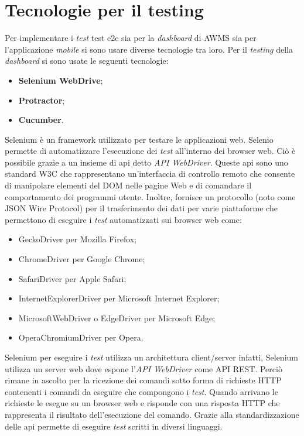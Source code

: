 \section{Tecnologie per il testing}
Per implementare i \emph{test} \gls{test e2e} sia per la \emph{dashboard} di \gls{AWMS} sia per l'applicazione \emph{mobile} si sono usare diverse tecnologie tra loro. Per il \emph{testing} della \emph{dashboard} si sono usate le seguenti tecnologie:
\begin{itemize}
	\item \textbf{Selenium WebDrive};
	\item \textbf{Protractor};
	\item \textbf{Cucumber}.
\end{itemize}
Selenium è un framework utilizzato per testare le applicazioni web. Selenio permette di  automatizzare l'esecuzione dei \emph{test} all'interno dei browser web. Ciò è possibile grazie a un insieme di \gls{api}\ap{[g]} detto \emph{API WebDriver}. Queste \gls{api}\ap{[g]} sono uno standard W3C che rappresentano un'interfaccia di controllo remoto che consente di manipolare elementi del DOM nelle pagine Web e di comandare il comportamento dei programmi utente. Inoltre, fornisce un protocollo (noto come JSON Wire Protocol) per il trasferimento dei dati per varie piattaforme che permettono di eseguire i \emph{test} automatizzati sui browser web come:
\begin{itemize}
	\item GeckoDriver per Mozilla Firefox;
	\item ChromeDriver per Google Chrome;
	\item SafariDriver per Apple Safari;
	\item InternetExplorerDriver per Microsoft Internet Explorer;
	\item MicrosoftWebDriver o EdgeDriver per Microsoft Edge;
	\item OperaChromiumDriver per Opera.
\end{itemize}
Selenium per eseguire i \emph{test} utilizza un architettura client/server infatti, Selenium utilizza un server web dove espone l'\emph{API WebDriver} come API REST. Perciò rimane in ascolto per la ricezione dei comandi sotto forma di richieste HTTP contenenti i comandi da eseguire che compongono i \emph{test}. Quando arrivano le richieste le esegue su un browser web e risponde con una risposta HTTP che rappresenta il risultato dell'esecuzione del comando. Grazie alla standardizzazione delle \gls{api}\ap{[g]} permette di eseguire \emph{test} scritti in diversi linguaggi.

